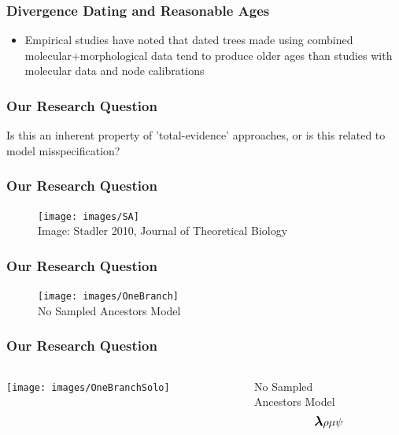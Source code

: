 \documentclass[]{beamer}
\begin{document}
\begin{frame}
\frametitle{Divergence Dating and Reasonable Ages}
\begin{itemize}
\item Empirical studies have noted that dated trees made using combined molecular+morphological data tend to produce older ages than studies with molecular data and node calibrations
\end{itemize}
\end{frame}

\begin{frame}
\frametitle{Our Research Question}
Is this an inherent property of 'total-evidence' approaches, or is this related to model misspecification?
\end{frame}

\begin{frame}
\frametitle{Our Research Question}
\begin{figure}
\texttt{[image: images/SA]} \\
Image: Stadler 2010, Journal of Theoretical Biology
\end{figure}
\end{frame}

\begin{frame}
\frametitle{Our Research Question}
\begin{figure}
\texttt{[image: images/OneBranch]} \\
No Sampled Ancestors Model
\end{figure}
\end{frame}


\begin{frame}
\frametitle{Our Research Question}
\begin{columns}
\begin{column}{0.5\textwidth}
\texttt{[image: images/OneBranchSolo]} \\
\end{column}
\begin{column}{0.5\textwidth}
\begin{center}
No Sampled \\ Ancestors Model \\
\[ \mathlarger{\boldsymbol{\lambda}} \\
\rho \\
\mu \\
 \psi \]
\end{center}
\end{column}
\end{columns}
\end{frame}
\end{document}
